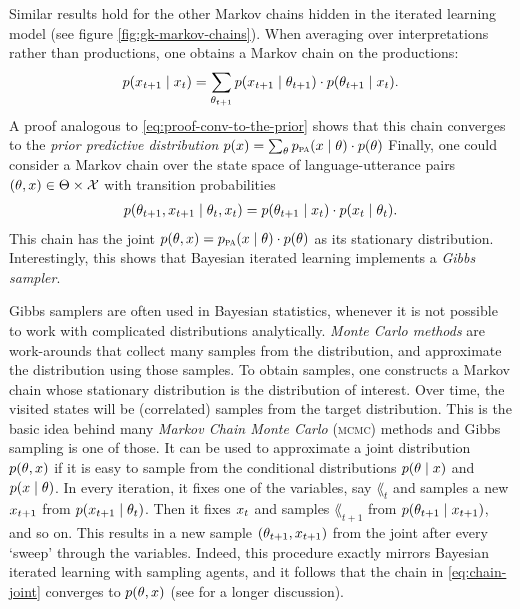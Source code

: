 \documentclass{../src/bcthesispart}
\begin{document}
Similar results hold for the other Markov chains hidden in the iterated learning model (see figure \ref{fig:gk-markov-chains}).
When averaging over interpretations rather than productions, one obtains a Markov chain on the productions:
\begin{align}
	p(x_{t+1} \mid x_t) 
		= \sum_{\theta_{t+1}} p(x_{t+1} \mid \theta_{t+1}) 
			\cdot p(\theta_{t+1}\mid x_t).
\end{align}
A proof analogous to \eqref{eq:proof-conv-to-the-prior} shows that this chain converges to the \emph{prior predictive distribution} $p(x)  =  \sum_{\theta} p_{\textsc{pa}}(x \mid \theta) \cdot p(\theta)$
Finally, one could consider a Markov chain over the state space of language-utterance pairs $(\theta, x) \in \Theta\times \mathcal{X}$ with transition probabilities
\begin{align}
	\label{eq:chain-joint}
	p(\theta_{t+1}, x_{t+1} \mid \theta_t, x_t) 
		= p(\theta_{t+1} \mid x_t) 
			\cdot p(x_t \mid \theta_t).
\end{align}
This chain has the joint $p(\theta, x) = p_{\textsc{pa}}(x \mid \theta) \cdot p(\theta)$ as its stationary distribution.
Interestingly, this shows that Bayesian iterated learning implements a \emph{Gibbs sampler}.




Gibbs samplers are often used in Bayesian statistics, whenever it is not possible to work with complicated distributions analytically.
\emph{Monte Carlo methods} are work-arounds that collect many samples from the distribution, and approximate the distribution using those samples.
To obtain samples, one constructs a Markov chain whose stationary distribution is the distribution of interest.
Over time, the visited states will be (correlated) samples from the target distribution.
This is the basic idea behind many \emph{Markov Chain Monte Carlo} (\textsc{mcmc}) methods and Gibbs sampling is one of those.
It can be used to approximate a joint distribution $p(\theta,x)$ if it is easy to sample from the conditional distributions $p(\theta\mid x)$ and $p(x\mid\theta)$.
In every iteration, it fixes one of the variables, say $\lang_t$ and samples a new $x_{t+1}$ from $p(x_{t+1}\mid\theta_t)$. 
Then it fixes $x_t$ and samples $\lang_{t+1}$ from $p(\theta_{t+1}\mid x_{t+1})$, and so on.
This results in a new sample $(\theta_{t+1}, x_{t+1})$ from the joint after every ‘sweep’ through the variables.
Indeed, this procedure exactly mirrors Bayesian iterated learning with sampling agents, and it follows that the chain in \eqref{eq:chain-joint} converges to $p(\theta, x)$ (see \cite{Griffiths2007a} for a longer discussion).
\end{document}
